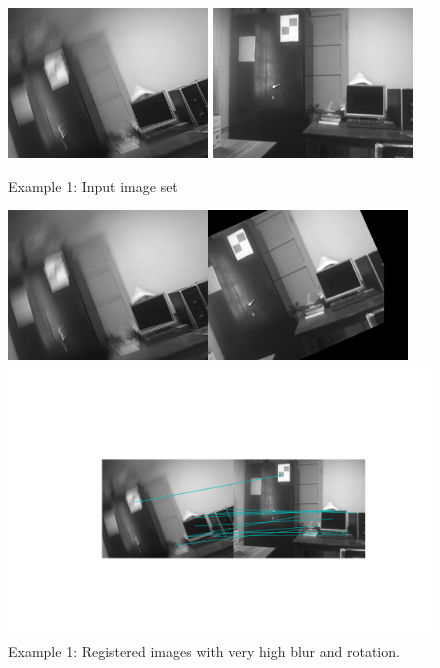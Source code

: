 \documentclass[BTech]{iitmdiss}
\begin{document}
\begin{figure}[H]
\begin{center}
\includegraphics[width=150pt]{images/imreg/rotation/eg1/saved_im.png}
\includegraphics[width=150pt]{images/imreg/rotation/eg1/preview_im.png}
\caption{Example 1: Input image set}
\includegraphics[width=300pt]{images/imreg/rotation/eg1/imreg.png}
\caption{Example 1: Registered images with very high blur and rotation.}
\includegraphics[width=400pt]{images/imreg/rotation/eg1/sift_based.png}
\vspace{-2cm}

\end{center}
\end{figure}
\end{document}
